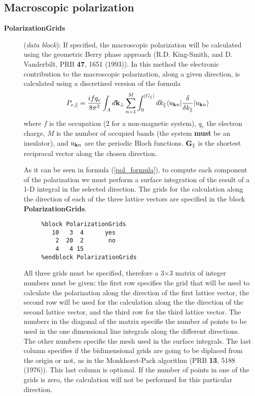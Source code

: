 \documentclass[11pt]{article}
\begin{document}
\vspace{5pt}
\subsection{Macroscopic polarization}

\begin{description}

\item[{\bf PolarizationGrids}] ({\it data block}):
If specified, the macroscopic polarization will be calculated using the
geometric Berry phase approach (R.D. King-Smith, and D. Vanderbilt,
PRB {\bf 47}, 1651 (1993)). In this method the electronic 
contribution to the macroscopic polarization, along a given direction, 
is calculated using
a discretized version of the formula
\begin{equation}
\label{pol_formula}
    P_{e,\parallel}={ifq_e \over 8\pi^3} \int_A d{\bf k}_\perp
    \sum_{n=1}^M \int_0^{|G_\parallel|} dk_{\parallel}
     \langle u_{{\bf k} n} |{\delta \over \delta k_{\parallel}} |
      u_{{\bf k} n} \rangle
\end{equation}
where $f$ is the occupation (2 for a non-magnetic system), 
$q_e$ the electron charge, $M$ is the number of occupied bands (the
system {\bf must} be an insulator), and $u_{{\bf k} n}$ are
the periodic Bloch functions. ${\bf G}_\parallel$ is the shortest
reciprocal vector along the chosen direction. 

As it can be seen in formula (\ref{pol_formula}), to compute each 
component of the polarization we must perform a surface integration
of the result of a 1-D integral in the selected direction. 
The grids for the calculation along the direction of each of the
three lattice vectors are specified in the block
{\bf PolarizationGrids}. 
\begin{verbatim}
     %block PolarizationGrids
        10   3  4      yes
         2  20  2       no
         4   4 15
     %endblock PolarizationGrids
\end{verbatim}      

All three grids must be specified, therefore a 3$\times$3 matrix of
integer numbers must be given: the first row specifies the grid that
will be used to calculate the polarization along the direction of the
first lattice vector, the second row will be used for the calculation
along the the direction of the second lattice vector, and the third
row for the third lattice vector.  The numbers in the diagonal of the
matrix specifie the number of points to be used in the one dimensional
line integrals along the different directions. The other numbers
specifie the mesh used in the surface integrals.  The last column
specifies if the bidimensional grids are going to be diplaced from the
origin or not, as in the Monkhorst-Pack algorithm (PRB {\bf 13}, 5188
(1976)).  This last column is optional.  If the number of points in
one of the grids is zero, the calculation will not be performed for
this particular direction.


\end{description}
\end{document}
